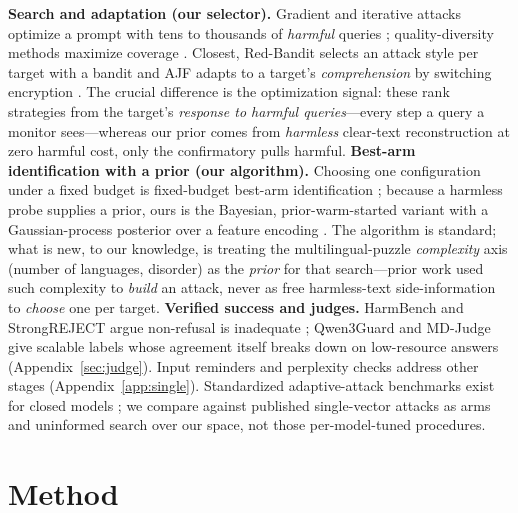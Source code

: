 \documentclass{article}
\begin{document}
\textbf{Search and adaptation (our selector).} Gradient and iterative attacks optimize a prompt with tens to thousands of \emph{harmful} queries \citep{zou2023universal,chao2023pair,liu2024autodan,yu2023gptfuzzer,mehrotra2024tap,liu2024flipattack,ding2024renellm}; quality-diversity methods maximize coverage \citep{samvelyan2024rainbow,hong2024curiosity}. Closest, Red-Bandit selects an attack style per target with a bandit \citep{redbandit2025} and AJF adapts to a target's \emph{comprehension} by switching encryption \citep{yu2025ajf}. The crucial difference is the optimization signal: these rank strategies from the target's \emph{response to harmful queries}---every step a query a monitor sees---whereas our prior comes from \emph{harmless} clear-text reconstruction at zero harmful cost, only the confirmatory pulls harmful. \textbf{Best-arm identification with a prior (our algorithm).} Choosing one configuration under a fixed budget is fixed-budget best-arm identification \citep{audibert2010bestarm}; because a harmless probe supplies a prior, ours is the Bayesian, prior-warm-started variant \citep{atsidakou2022bayesbai,nguyen2025priorbai} with a Gaussian-process posterior over a feature encoding \citep{srinivas2010gpucb,snoek2012practical}. The algorithm is standard; what is new, to our knowledge, is treating the multilingual-puzzle \emph{complexity} axis (number of languages, disorder) as the \emph{prior} for that search---prior work used such complexity to \emph{build} an attack, never as free harmless-text side-information to \emph{choose} one per target. \textbf{Verified success and judges.} HarmBench and StrongREJECT argue non-refusal is inadequate \citep{mazeika2024harmbench,souly2024strongreject}; Qwen3Guard and MD-Judge give scalable labels \citep{qwen3guard2025,li2024salad} whose agreement itself breaks down on low-resource answers (Appendix~\ref{sec:judge}). Input reminders \citep{xie2023selfreminder} and perplexity checks \citep{jain2023baseline,alon2023detecting} address other stages (Appendix~\ref{app:single}). Standardized adaptive-attack benchmarks exist for closed models \citep{andriushchenko2025adaptive,chao2024jailbreakbench}; we compare against published single-vector attacks as arms and uninformed search over our space, not those per-model-tuned procedures.

\section{Method}
\label{sec:method}
\end{document}
